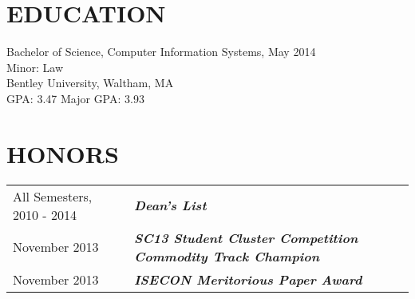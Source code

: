 \documentclass[line, margin]{res}
\begin{document}
\address{6 Cobblers Lane\\ North Reading, MA\\ (978) 505-5359\\ hentschel.nicholas@gmail.com}
\begin{resume}

\section{EDUCATION}
  Bachelor of Science, Computer Information Systems, May 2014 \\
  Minor: Law \\
  Bentley University, Waltham, MA \\
  GPA: 3.47 Major GPA: 3.93

\section{HONORS}
\begin{tabular}{@{}l l}
All Semesters, 2010 - 2014 & \textbf{\textit{Dean's List}} \\ [5pt]
November 2013 & \textbf{\textit{SC13 Student Cluster Competition Commodity Track Champion}} \\ [5pt]
November 2013 & \textbf{\textit{ISECON Meritorious Paper Award}} \\ [5pt]
\end{tabular}



\end{resume}
\end{document}
